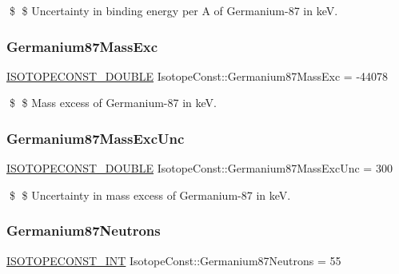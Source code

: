 \$ \$ Uncertainty in binding energy per A of Germanium-\/87 in keV. \mbox{\label{group___isotope_const-_germanium-_ge87_ga77d270ac65638a5a9daf8b2e4d1383ce}} 
\subsubsection{\texorpdfstring{Germanium87\+Mass\+Exc}{Germanium87MassExc}}
{\footnotesize\ttfamily \mbox{\hyperlink{group___isotope_const-_macros_ga8f45a7272ce02c0b4c65c44636ed719a}{I\+S\+O\+T\+O\+P\+E\+C\+O\+N\+S\+T\+\_\+\+D\+O\+U\+B\+LE}} Isotope\+Const\+::\+Germanium87\+Mass\+Exc = -\/44078}

\$ \$ Mass excess of Germanium-\/87 in keV. \mbox{\label{group___isotope_const-_germanium-_ge87_ga9c38c835036b7a9fcbe1e52a093bcd56}} 
\subsubsection{\texorpdfstring{Germanium87\+Mass\+Exc\+Unc}{Germanium87MassExcUnc}}
{\footnotesize\ttfamily \mbox{\hyperlink{group___isotope_const-_macros_ga8f45a7272ce02c0b4c65c44636ed719a}{I\+S\+O\+T\+O\+P\+E\+C\+O\+N\+S\+T\+\_\+\+D\+O\+U\+B\+LE}} Isotope\+Const\+::\+Germanium87\+Mass\+Exc\+Unc = 300}

\$ \$ Uncertainty in mass excess of Germanium-\/87 in keV. \mbox{\label{group___isotope_const-_germanium-_ge87_gad1f7068c0b551ceb40b9d096729e6705}} 
\subsubsection{\texorpdfstring{Germanium87\+Neutrons}{Germanium87Neutrons}}
{\footnotesize\ttfamily \mbox{\hyperlink{group___isotope_const-_macros_ga5f18360b3e99483a35c32d789e62621c}{I\+S\+O\+T\+O\+P\+E\+C\+O\+N\+S\+T\+\_\+\+I\+NT}} Isotope\+Const\+::\+Germanium87\+Neutrons = 55}

